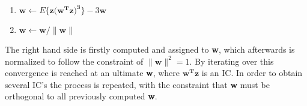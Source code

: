 \begin{enumerate}
\item $\mathbf{w}  \leftarrow  E\{{\mathbf{z}(\mathbf{w^{T}\mathbf{z})^3}}\} - 3\mathbf{w}$
\item $\mathbf{w}  \leftarrow \mathbf{w} / \parallel \mathbf{w} \parallel$
\end{enumerate}
 									
 					
The right hand side is firstly computed and assigned to \textbf{w}, which afterwards is normalized to follow the constraint of $\parallel \mathbf{w} \parallel ^2 = 1$. By iterating over this convergence is reached at an ultimate \textbf{w}, where $\mathbf{w^{T}\mathbf{z}}$ is an IC. In order to obtain several IC’s the process is repeated, with the constraint that \textbf{w} must be orthogonal to all previously computed \textbf{w}. 
 						